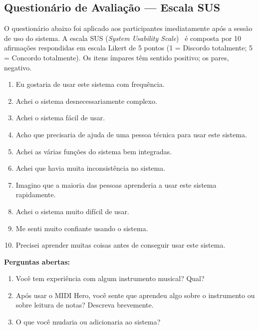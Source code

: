 \documentclass[
  12pt,
  openright,
  twoside,
  a4paper,
  english,
  brazil
]{abntex2}
\begin{document}
\begin{apendicesenv}
\partapendices

\chapter{Questionário de Avaliação --- Escala SUS}
\label{ap:sus}

O questionário abaixo foi aplicado aos participantes imediatamente
após a sessão de uso do sistema. A escala SUS (\textit{System Usability
Scale})~\cite{brooke1996} é composta por 10 afirmações respondidas em
escala Likert de 5 pontos (1 = Discordo totalmente; 5 = Concordo
totalmente). Os itens ímpares têm sentido positivo; os pares, negativo.

\begin{enumerate}
  \item Eu gostaria de usar este sistema com frequência.
  \item Achei o sistema desnecessariamente complexo.
  \item Achei o sistema fácil de usar.
  \item Acho que precisaria de ajuda de uma pessoa técnica para usar
        este sistema.
  \item Achei as várias funções do sistema bem integradas.
  \item Achei que havia muita inconsistência no sistema.
  \item Imagino que a maioria das pessoas aprenderia a usar este
        sistema rapidamente.
  \item Achei o sistema muito difícil de usar.
  \item Me senti muito confiante usando o sistema.
  \item Precisei aprender muitas coisas antes de conseguir usar
        este sistema.
\end{enumerate}

\noindent
\textbf{Perguntas abertas:}
\begin{enumerate}
  \item[11.] Você tem experiência com algum instrumento musical?
        Qual?
  \item[12.] Após usar o MIDI Hero, você sente que aprendeu algo
        sobre o instrumento ou sobre leitura de notas? Descreva
        brevemente.
  \item[13.] O que você mudaria ou adicionaria ao sistema?
\end{enumerate}


\end{apendicesenv}
\end{document}
